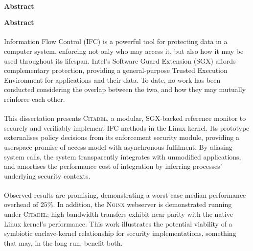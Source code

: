 \newpage

\ifblind 

\begin{center}
    \vspace*{1mm}
    \noindent
    \huge
    \dissertationtitle \\
    \vspace{18pt} 
    {\large \bf \sc Abstract}
    \vspace{12pt} 
\end{center}

\else
{\Huge \bf Abstract}
\vspace{24pt} 
\fi


\paragraph{} Information Flow Control (IFC) is a powerful tool for protecting data in a computer system, enforcing not only who may access it, but also how it may be used throughout its lifespan. Intel's Software Guard Extension (SGX) affords complementary protection, providing a general-purpose Trusted Execution Environment for applications and their data. To date, no work has been conducted considering the overlap between the two, and how they may mutually reinforce each other.

\paragraph{} This dissertation presents \textsc{Citadel}, a modular, SGX-backed reference monitor to securely and verifiably implement IFC methods in the Linux kernel. Its prototype externalises policy decisions from its enforcement security module, providing a userspace promise-of-access model with asynchronous fulfilment. By aliasing system calls, the system transparently integrates with unmodified applications, and amortises the performance cost of integration by inferring processes' underlying security contexts.

\paragraph{} Observed results are promising, demonstrating a worst-case median performance overhead of $25\%$. In addition, the \textsc{Nginx} webserver is demonstrated running under \textsc{Citadel}; high bandwidth transfers exhibit near parity with the native Linux kernel's performance. This work illustrates the potential viability of a symbiotic enclave-kernel relationship for security implementations, something that may, in the long run, benefit both.



\newpage

\vspace*{\fill}
